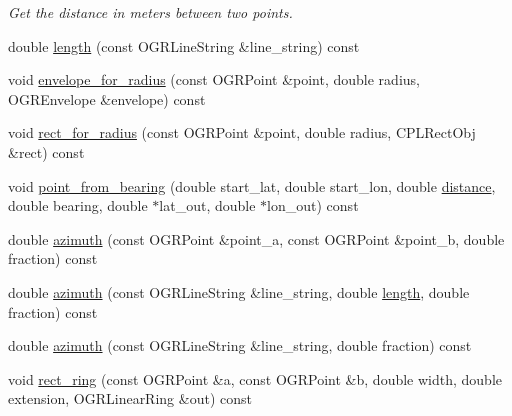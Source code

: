 \begin{DoxyCompactItemize}
\begin{DoxyCompactList}\small\item\em Get the distance in meters between two points. \end{DoxyCompactList}\item 
double \hyperlink{classgeo_1_1Spatial_a6bcfc529e8ab148e30cb58f243362eee}{length} (const O\+G\+R\+Line\+String \&line\+\_\+string) const 
\item 
void \hyperlink{classgeo_1_1Spatial_a6550ab40ef68eee2bc2345df92a65f37}{envelope\+\_\+for\+\_\+radius} (const O\+G\+R\+Point \&point, double radius, O\+G\+R\+Envelope \&envelope) const 
\item 
void \hyperlink{classgeo_1_1Spatial_a4d594e436dd265ed927e6ce4d3a8db42}{rect\+\_\+for\+\_\+radius} (const O\+G\+R\+Point \&point, double radius, C\+P\+L\+Rect\+Obj \&rect) const 
\item 
void \hyperlink{classgeo_1_1Spatial_aab7fbff6c1e0dbc56e58ff3065a435d2}{point\+\_\+from\+\_\+bearing} (double start\+\_\+lat, double start\+\_\+lon, double \hyperlink{classgeo_1_1Spatial_a9530b4b540b4601fa6254d2a30c17b95}{distance}, double bearing, double $\ast$lat\+\_\+out, double $\ast$lon\+\_\+out) const 
\item 
double \hyperlink{classgeo_1_1Spatial_abac49c2a0f02415321758d9cdbc86f92}{azimuth} (const O\+G\+R\+Point \&point\+\_\+a, const O\+G\+R\+Point \&point\+\_\+b, double fraction) const 
\item 
double \hyperlink{classgeo_1_1Spatial_a834e931e1879d3296e365b74215da09e}{azimuth} (const O\+G\+R\+Line\+String \&line\+\_\+string, double \hyperlink{classgeo_1_1Spatial_a6bcfc529e8ab148e30cb58f243362eee}{length}, double fraction) const 
\item 
double \hyperlink{classgeo_1_1Spatial_a2e45a6bce9ffd26b9d8546876747e118}{azimuth} (const O\+G\+R\+Line\+String \&line\+\_\+string, double fraction) const 
\item 
void \hyperlink{classgeo_1_1Spatial_a34a03dcb8afdca6fc2d4cfc3fd3025e6}{rect\+\_\+ring} (const O\+G\+R\+Point \&a, const O\+G\+R\+Point \&b, double width, double extension, O\+G\+R\+Linear\+Ring \&out) const 
\end{DoxyCompactItemize}
